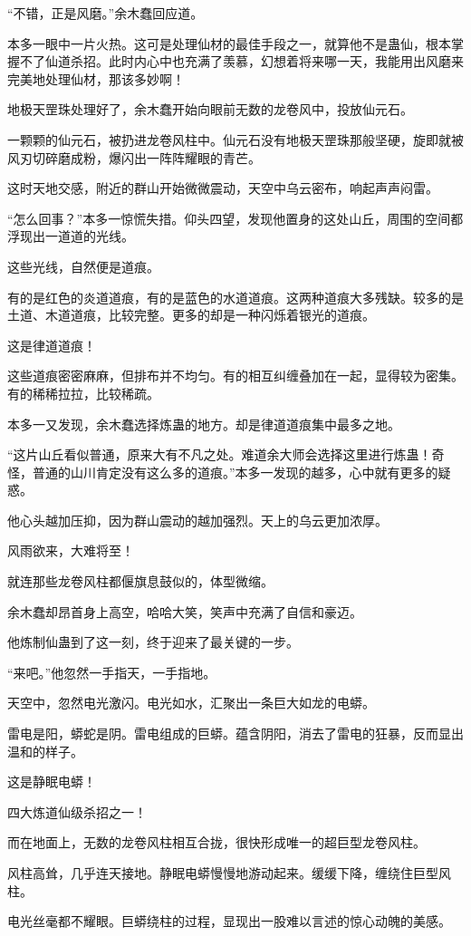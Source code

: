 \begin{this_body}
“不错，正是风磨。”余木蠢回应道。

本多一眼中一片火热。这可是处理仙材的最佳手段之一，就算他不是蛊仙，根本掌握不了仙道杀招。此时内心中也充满了羡慕，幻想着将来哪一天，我能用出风磨来完美地处理仙材，那该多妙啊！

地极天罡珠处理好了，余木蠢开始向眼前无数的龙卷风中，投放仙元石。

一颗颗的仙元石，被扔进龙卷风柱中。仙元石没有地极天罡珠那般坚硬，旋即就被风刃切碎磨成粉，爆闪出一阵阵耀眼的青芒。

这时天地交感，附近的群山开始微微震动，天空中乌云密布，响起声声闷雷。

“怎么回事？”本多一惊慌失措。仰头四望，发现他置身的这处山丘，周围的空间都浮现出一道道的光线。

这些光线，自然便是道痕。

有的是红色的炎道道痕，有的是蓝色的水道道痕。这两种道痕大多残缺。较多的是土道、木道道痕，比较完整。更多的却是一种闪烁着银光的道痕。

这是律道道痕！

这些道痕密密麻麻，但排布并不均匀。有的相互纠缠叠加在一起，显得较为密集。有的稀稀拉拉，比较稀疏。

本多一又发现，余木蠢选择炼蛊的地方。却是律道道痕集中最多之地。

“这片山丘看似普通，原来大有不凡之处。难道余大师会选择这里进行炼蛊！奇怪，普通的山川肯定没有这么多的道痕。”本多一发现的越多，心中就有更多的疑惑。

他心头越加压抑，因为群山震动的越加强烈。天上的乌云更加浓厚。

风雨欲来，大难将至！

就连那些龙卷风柱都偃旗息鼓似的，体型微缩。

余木蠢却昂首身上高空，哈哈大笑，笑声中充满了自信和豪迈。

他炼制仙蛊到了这一刻，终于迎来了最关键的一步。

“来吧。”他忽然一手指天，一手指地。

天空中，忽然电光激闪。电光如水，汇聚出一条巨大如龙的电蟒。

雷电是阳，蟒蛇是阴。雷电组成的巨蟒。蕴含阴阳，消去了雷电的狂暴，反而显出温和的样子。

这是静眠电蟒！

四大炼道仙级杀招之一！

而在地面上，无数的龙卷风柱相互合拢，很快形成唯一的超巨型龙卷风柱。

风柱高耸，几乎连天接地。静眠电蟒慢慢地游动起来。缓缓下降，缠绕住巨型风柱。

电光丝毫都不耀眼。巨蟒绕柱的过程，显现出一股难以言述的惊心动魄的美感。


\end{this_body}
